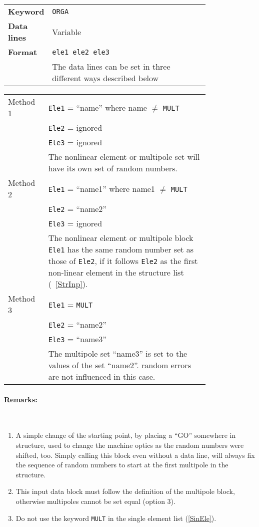 \bigskip
\begin{tabular}{@{}lp{0.8\linewidth}}
    \textbf{Keyword}    & \texttt{ORGA} \\
    \textbf{Data lines} & Variable \\
    \textbf{Format}     & \texttt{ele1 ele2 ele3} \\
                        & The data lines can be set in three different ways described below
\end{tabular}

\bigskip
\begin{tabular}{@{}lp{0.8\linewidth}}
    Method 1 & \texttt{Ele1} = ``name'' where name $\ne$ \texttt{MULT} \\
             & \texttt{Ele2} = ignored  \\
             & \texttt{Ele3} = ignored  \\
             & The nonlinear element or multipole set will have its own set of random numbers. \\
    Method 2 & \texttt{Ele1} = ``name1'' where name1 $\ne$ \texttt{MULT} \\
             & \texttt{Ele2} = ``name2'' \\
             & \texttt{Ele3} = ignored \\
             & The nonlinear element or multipole block \texttt{Ele1} has the same random number set as those of \texttt{Ele2}, if it follows \texttt{Ele2} as the first non-linear element in the structure list (~\ref{StrInp}). \\
    Method 3 & \texttt{Ele1} = \texttt{MULT} \\
             & \texttt{Ele2} = ``name2'' \\
             & \texttt{Ele3} = ``name3'' \\
             & The multipole set ``name3'' is set to the values of the set ``name2''. random errors are not influenced in this case.
\end{tabular}

\paragraph{Remarks:}~

\begin{enumerate}
    \item A simple change of the starting point, by placing a ``GO'' somewhere in structure, used to change the machine optics as the random numbers were shifted, too. Simply calling this block even without a data line, will always fix the sequence of random numbers to start at the first multipole in the structure.
    \item This input data block must follow the definition of the multipole block, otherwise multipoles cannot be set equal (option 3).
    \item Do not use the keyword \texttt{MULT} in the single element list (\ref{SinEle}).
\end{enumerate}

